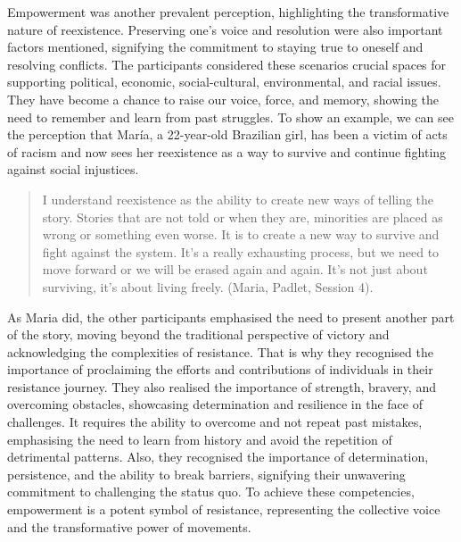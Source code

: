 \documentclass[english]{textolivre}
\begin{document}
Empowerment was another prevalent perception, highlighting the transformative nature of reexistence. Preserving one's voice and resolution were also important factors mentioned, signifying the commitment to staying true to oneself and resolving conflicts. The participants considered these scenarios crucial spaces for supporting political, economic, social-cultural, environmental, and racial issues. They have become a chance to raise our voice, force, and memory, showing the need to remember and learn from past struggles. To show an example, we can see the perception that María, a 22-year-old Brazilian girl, has been a victim of acts of racism and now sees her reexistence as a way to survive and continue fighting against social injustices.

\begin{quote}
    I understand reexistence as the ability to create new ways of telling the story. Stories that are not told or when they are, minorities are placed as wrong or something even worse. It is to create a new way to survive and fight against the system. It's a really exhausting process, but we need to move forward or we will be erased again and again. It's not just about surviving, it's about living freely. (Maria, Padlet, Session 4).
\end{quote}

As Maria did, the other participants emphasised the need to present another part of the story, moving beyond the traditional perspective of victory and acknowledging the complexities of resistance. That is why they recognised the importance of proclaiming the efforts and contributions of individuals in their resistance journey. They also realised the importance of strength, bravery, and overcoming obstacles, showcasing determination and resilience in the face of challenges. It requires the ability to overcome and not repeat past mistakes, emphasising the need to learn from history and avoid the repetition of detrimental patterns. Also, they recognised the importance of determination, persistence, and the ability to break barriers, signifying their unwavering commitment to challenging the status quo. To achieve these competencies, empowerment is a potent symbol of resistance, representing the collective voice and the transformative power of movements.
\end{document}

